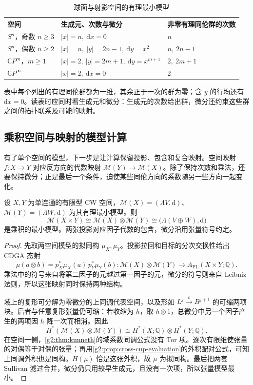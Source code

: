 \begin{table}[htbp]
	\centering
	\caption{球面与射影空间的有理最小模型}
	\label{g2:tab:sphere-projective-models}
	\begin{tabularx}{\textwidth}{@{}lXX@{}}
		\toprule
		空间 & 生成元、次数与微分 & 非零有理同伦群的次数 \\
		\midrule
		\(S^n\)，奇数 \(n\geq3\) & \(|x|=n,\ \mathrm dx=0\) & \(n\) \\
		\(S^n\)，偶数 \(n\geq2\) & \(|x|=n,\ |y|=2n-1,\ \mathrm dy=x^2\) & \(n,\ 2n-1\) \\
		\(\mathbb CP^m\)，\(m\geq1\) & \(|x|=2,\ |y|=2m+1,\ \mathrm dy=x^{m+1}\) & \(2,\ 2m+1\) \\
		\(\mathbb CP^\infty\) & \(|x|=2,\ \mathrm dx=0\) & \(2\) \\
		\bottomrule
	\end{tabularx}
\end{table}

表中每个列出的有理同伦群都为一维，其余正于一次的群为零；含 \(y\) 的行均还有 \(\mathrm dx=0\)。读表时应同时看生成元和微分：生成元的次数给出群，微分还约束这些群之间的拓扑联系及可能的映射。

\subsection{乘积空间与映射的模型计算}
\label{g2:subsec:E03:04}

有了单个空间的模型，下一步是让计算保留投影、包含和复合映射。空间映射 \(f:X\to Y\) 对应反方向的代数映射 \(\mathcal M(Y)\to\mathcal M(X)\)。除了保持次数和乘法，还要保持微分；正是最后一个条件，迫使某些同伦方向的系数随另一些方向一起变化。

\begin{proposition}\label{g2:prop:product-minimal-model}
	设 \(X,Y\) 为单连通的有限型 CW 空间，\(\mathcal M(X)=(\Lambda V,\mathrm d)\)、\(\mathcal M(Y)=(\Lambda W,\mathrm d)\) 为其有理最小模型。则
	\[
		\mathcal M(X\times Y)\cong\mathcal M(X)\otimes\mathcal M(Y)
		\cong\bigl(\Lambda(V\oplus W),\mathrm d\bigr)
	\]
	是乘积的最小模型。两张投影对应因子代数的包含，微分沿用张量符号约定。
\end{proposition}
\begin{proof}
	先取两空间模型的拟同构 \(\mu_X,\mu_Y\)。投影拉回和目标的分次交换性给出 CDGA 态射
	\[
		\mu(a\otimes b)=p_X^*\mu_X(a)\,p_Y^*\mu_Y(b)
		:\mathcal M(X)\otimes\mathcal M(Y)\longrightarrow A_{\mathrm{PL}}(X\times Y;\mathbb Q).
	\]
	乘法中的符号来自将第二因子的元越过第一因子的元，微分的符号则来自 Leibniz 法则，所以这张映射同时保持两种结构。

	域上的复形可分解为零微分的上同调代表空间，以及形如 \(L^j\xrightarrow{\mathrm d}B^{j+1}\) 的可缩两项块。后者与任意复形张量仍可缩：若收缩为 \(h\)，取 \(h\otimes1\)，总微分中另一个因子产生的两项因 \(h\) 降一次而相消。因此
	\[
		H^*(\mathcal M(X)\otimes\mathcal M(Y))
		\cong H^*(X;\mathbb Q)\otimes H^*(Y;\mathbb Q).
	\]
	在空间一侧，\cref{g2:thm:kunneth}的域系数同调公式没有 Tor 项。逐次有限维使张量的对偶等于对偶的张量；再用\cref{g2:prop:cross-cup-evaluation}的外积配对公式，可知上同调外积也是同构。\(H(\mu)\) 恰是这张外积，故 \(\mu\) 为拟同构。最后把两套 Sullivan 滤过合并，微分仍只用较早生成元，且没有一次项，所以张量模型最小。
\end{proof}

